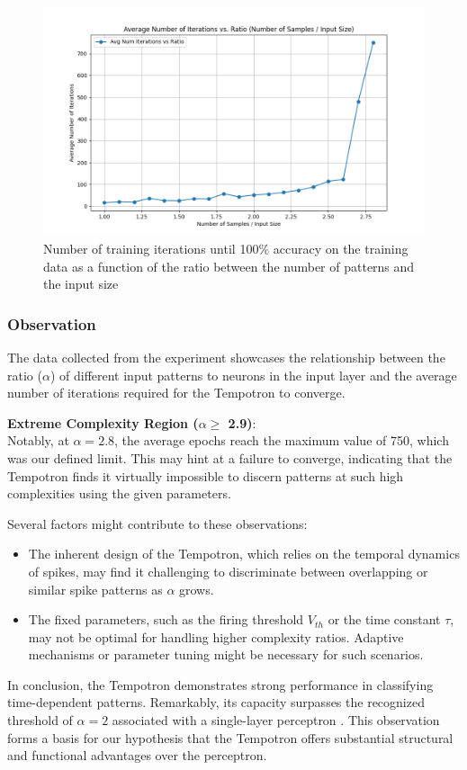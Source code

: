 \begin{figure}[H]
    \centering
    \includegraphics[width=0.8\linewidth]{results/graphs/alpha-validation.png}
    \caption{Number of training iterations until 100\% accuracy on the training data as a function of the ratio between the number of patterns and the input size}
    \label{fig:alpha-validation}
\end{figure}


\subsubsection{Observation}

The data collected from the experiment showcases the relationship between the ratio (\( \alpha \)) of different input patterns to neurons in the input layer and the average number of iterations required for the Tempotron to converge.

\textbf{Extreme Complexity Region (\( \alpha \geq\) 2.9)}: \\
Notably, at \( \alpha = 2.8 \), the average epochs reach the maximum value of 750, which was our defined limit. This may hint at a failure to converge, indicating that the Tempotron finds it virtually impossible to discern patterns at such high complexities using the given parameters.

Several factors might contribute to these observations:

\begin{itemize}
    \item The inherent design of the Tempotron, which relies on the temporal dynamics of spikes, may find it challenging to discriminate between overlapping or similar spike patterns as \( \alpha \) grows.
    
    \item The fixed parameters, such as the firing threshold \( V_{th} \) or the time constant \( \tau \), may not be optimal for handling higher complexity ratios. Adaptive mechanisms or parameter tuning might be necessary for such scenarios.
    
\end{itemize}

In conclusion, the Tempotron demonstrates strong performance in classifying time-dependent patterns. Remarkably, its capacity surpasses the recognized threshold of \( \alpha = 2 \) associated with a single-layer perceptron \cite{gutig2006tempotron}. This observation forms a basis for our hypothesis that the Tempotron offers substantial structural and functional advantages over the perceptron.
